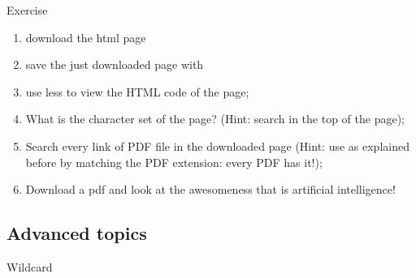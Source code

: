 \begin{frame}{Exercise}
	\begin{enumerate}
		\item<1-> download the html page 
		\item<2-> save the just downloaded page with 
		\item<3-> use less to view the HTML code of the page;
		\item<4-> What is the character set of the page? (Hint: search  in the top of the page);
		\item<5-> Search every link of PDF file in the downloaded page (Hint: use  as explained before by matching the PDF extension: every PDF has it!);
		\item<6-> Download a pdf and look at the awesomeness that is artificial intelligence!
	\end{enumerate}
\end{frame}

\subsection{Advanced topics}

\begin{frame}{Wildcard}
\end{frame}